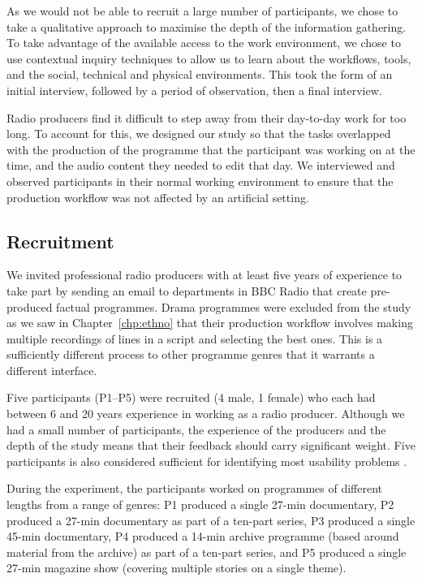 As we would not be able to recruit a large number of participants, we chose to take a qualitative approach to maximise
the depth of the information gathering. To take advantage of the available access to the work environment, we chose to
use contextual inquiry techniques to allow us to learn about the workflows, tools, and the social, technical and
physical environments. This took the form of an initial interview, followed by a period of observation, then a final
interview.

Radio producers find it difficult to step away from their day-to-day work for too long.  To account for this, we
designed our study so that the tasks overlapped with
the production of the programme that the participant was working on at the time, and the audio
content they needed to edit that day. We interviewed and observed participants in their normal working environment to
ensure that the production workflow was not affected by an artificial setting.

\subsection{Recruitment}

We invited professional radio producers with at least five years of experience to take part by sending an email to
departments in BBC Radio that create pre-produced factual programmes.  Drama programmes were excluded from the study as
we saw in Chapter~\ref{chp:ethno} that their production workflow involves making multiple recordings of lines in a
script and selecting the best ones. This is a sufficiently different process to other programme genres that it warrants
a different interface.

Five participants (P1--P5) were recruited (4 male, 1 female) who each had between 6 and 20 years experience in working
as a radio producer. Although we had a small number of participants, the experience of the producers and the depth of
the study means that their feedback should carry significant weight. Five participants is also considered sufficient
for identifying most usability problems \citep{Nielsen1993}.

During the experiment, the participants worked on programmes of different
lengths from a range of genres:
P1 produced a single 27-min documentary, %
P2 produced a 27-min documentary as part of a ten-part series,
P3 produced a single 45-min documentary,
P4 produced a 14-min archive programme
(based around material from the archive) as part of a ten-part series, and
P5 produced a single 27-min magazine show (covering multiple stories on a
single theme).

